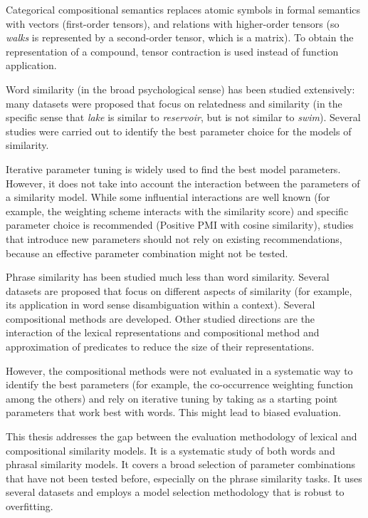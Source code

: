 Categorical compositional semantics replaces atomic symbols in formal semantics with vectors (first-order tensors), and relations with higher-order tensors (so \textit{walks} is represented by a second-order tensor, which is a matrix). To obtain the representation of a compound, tensor contraction is used instead of function application.

Word similarity (in the broad psychological sense) has been studied extensively: many datasets were proposed that focus on relatedness and similarity (in the specific sense that \textit{lake} is similar to \textit{reservoir}, but is not similar to \textit{swim}). Several studies were carried out to identify the best parameter choice for the models of similarity.

Iterative parameter tuning is widely used to find the best model parameters. However, it does not take into account the interaction between the parameters of a similarity model. While some influential interactions are well known (for example, the weighting scheme interacts with the similarity score) and specific parameter choice is recommended (Positive PMI with cosine similarity), studies that introduce new parameters should not rely on existing recommendations, because an effective parameter combination might not be tested.

Phrase similarity has been studied much less than word similarity. Several datasets are proposed that focus on different aspects of similarity (for example, its application in word sense disambiguation within a context). Several compositional methods are developed. Other studied directions are the interaction of the lexical representations and compositional method and approximation of predicates to reduce the size of their representations.

However, the compositional methods were not evaluated in a systematic way to identify the best parameters (for example, the co-occurrence weighting function among the others) and rely on iterative tuning by taking as a starting point parameters that work best with words. This might lead to biased evaluation.

This thesis addresses the gap between the evaluation methodology of lexical and compositional similarity models. It is a systematic study of both words and phrasal similarity models. It covers a broad selection of parameter combinations that have not been tested before, especially on the phrase similarity tasks. It uses several datasets and employs a model selection methodology that is robust to overfitting.

